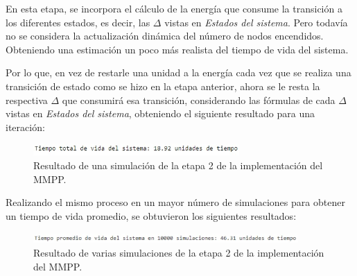\begin{enumerate}[label=\arabic*.]
En esta etapa, se incorpora el cálculo de la energía que consume la transición a los diferentes estados, es decir, las $\Delta$ vistas en \textit{Estados del sistema}. Pero todavía no se considera la actualización dinámica del número de nodos encendidos. Obteniendo una estimación un poco más realista del tiempo de vida del sistema.

Por lo que, en vez de restarle una unidad a la energía cada vez que se realiza una transición de estado como se hizo en la etapa anterior, ahora se le resta la respectiva $\Delta$ que consumirá esa transición, considerando las fórmulas de cada $\Delta$ vistas en \textit{Estados del sistema}, obteniendo el siguiente resultado para una iteración:

\begin{figure}[H]
    \centering
    \includegraphics[width=0.7\textwidth]{imagenes/mmpp2.1.jpg}
    \caption{Resultado de una simulación de la etapa 2 de la implementación del MMPP.}
\end{figure}

Realizando el mismo proceso en un mayor número de simulaciones para obtener un tiempo de vida promedio, se obtuvieron los siguientes resultados:

\begin{figure}[H]
    \centering
    \includegraphics[width=0.9\textwidth]{imagenes/mmpp2.2.jpg}
    \caption{Resultado de varias simulaciones de la etapa 2 de la implementación del MMPP.}
\end{figure}
\newpage


\end{enumerate}
